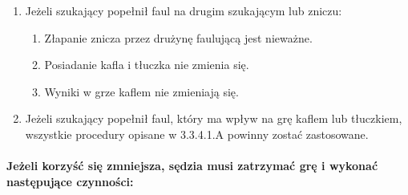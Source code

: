 \documentclass[12pt]{article}
\begin{document}
\begin{enumerate}
  \begin{enumerate}
  \item
        Jeżeli szukający popełnił faul na drugim szukającym lub zniczu:
    
    \begin{enumerate}
    \item
            Złapanie znicza przez drużynę faulującą jest nieważne.
          \item
            Posiadanie kafla i tłuczka nie zmienia się.
          \item
            Wyniki w grze kaflem nie zmieniają się.
          \end{enumerate}
  \item
        Jeżeli szukający popełnił faul, który ma wpływ na grę kaflem lub
    tłuczkiem, wszystkie procedury opisane w 3.3.4.1.A powinny zostać
    zastosowane.
      \end{enumerate}
\end{enumerate}

\paragraph{Jeżeli korzyść się zmniejsza, sędzia musi
zatrzymać grę i wykonać następujące czynności:}
\end{document}
